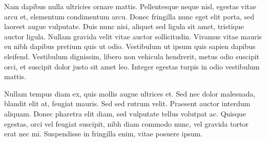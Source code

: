 \documentclass{minimal}
\begin{document}
Nam dapibus nulla ultricies ornare mattis. Pellentesque neque nisl, egestas
vitae arcu et, elementum condimentum arcu. Donec fringilla nunc eget elit
porta, sed laoreet augue vulputate. Duis nunc nisi, aliquet sed ligula sit
amet, tristique auctor ligula. Nullam gravida velit vitae auctor sollicitudin.
Vivamus vitae mauris eu nibh dapibus pretium quis ut odio. Vestibulum ut ipsum
quis sapien dapibus eleifend. Vestibulum dignissim, libero non vehicula
hendrerit, metus odio suscipit orci, et suscipit dolor justo sit amet leo.
Integer egestas turpis in odio vestibulum mattis.

Nullam tempus diam ex, quis mollis augue ultrices et. Sed nec dolor malesuada,
blandit elit at, feugiat mauris. Sed sed rutrum velit. Praesent auctor interdum
aliquam. Donec pharetra elit diam, sed vulputate tellus volutpat ac. Quisque
egestas, orci vel feugiat suscipit, nibh diam commodo nunc, vel gravida tortor
erat nec mi. Suspendisse in fringilla enim, vitae posuere ipsum.
\end{document}
